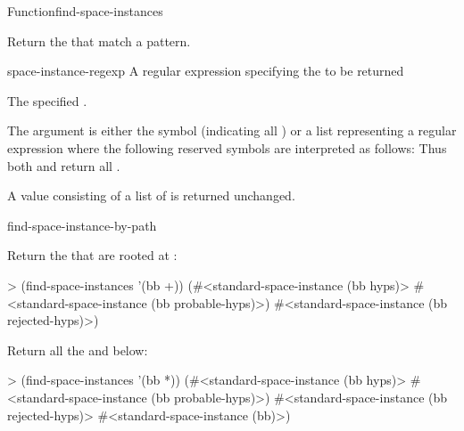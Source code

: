 \documentclass[10pt,twoside,english,pdftex]{article}
\begin{document}
\begin{functiondoc}{Function}{find-space-instances}%
  {
    \returns{} }

\fnsyntax

\fnpurpose Return the  that match a
 pattern.

\fnpackage {}

\fnmodule {}

\fnargs
\begin{args}{space-instance-regexp}
 A  regular expression
specifying the  to be returned 
\end{args}

\fnreturns The specified .

\fndescription 
{}%
The  argument is either the symbol
 (indicating all ) or a list
representing a regular expression where the following reserved symbols
are interpreted as follows: 
\spaceinstanceregexp
Thus both  and
 return all .

A  value consisting of a list of
 is returned unchanged.

\begin{alsos}{find-space-instance-by-path}
\end{alsos}

\fnexamples
Return the  that are rooted at :
%
\W\supp
\begin{example}
> (find-space-instances '(bb +))
(#<standard-space-instance (bb hyps)>
 #<standard-space-instance (bb probable-hyps)>)
 #<standard-space-instance (bb rejected-hyps)>)
\end{example}
%
Return all the   and below:
%
\W\supp\notpretop
\begin{example}
> (find-space-instances '(bb *))
(#<standard-space-instance (bb hyps)>
 #<standard-space-instance (bb probable-hyps)>)
 #<standard-space-instance (bb rejected-hyps)>
 #<standard-space-instance (bb)>)
\end{example}

\end{functiondoc}
\end{document}
